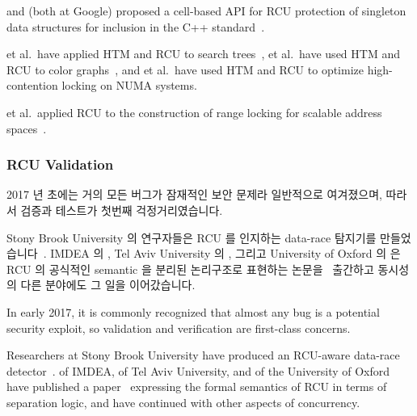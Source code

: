  and  (both at Google) proposed
a cell-based API for RCU
protection of singleton data structures for inclusion in the
C++ standard~\cite{GeoffRomer2018C++DeferredReclamationP0561R4}.

 et al.~have applied
HTM and RCU to search trees~\cite{Siakavaras2017CombiningHA,DimitriosSiakavaras2020RCU-HTM-B+Trees},
 et al.~have used HTM and RCU to color
graphs~\cite{ChristinaGiannoula2018HTM-RCU-graphcoloring},
and
 et al.~have used HTM and RCU to optimize high-contention
locking on NUMA systems.

 et al.~applied RCU to the construction of range locking
for scalable address spaces~\cite{AlexKogan2020RCUrangelocks}.

\fi

\subsubsection{RCU Validation}
\label{sec:defer:RCU Validation}

2017 년 초에는 거의 모든 버그가 잠재적인 보안 문제라 일반적으로 여겨졌으며,
따라서 검증과 테스트가 첫번째 걱정거리였습니다.

Stony Brook University 의 연구자들은 RCU 를 인지하는 data-race 탐지기를
만들었습니다~\cite{AbhinavDuggal2010Masters,JustinSeyster2012PhD,Seyster:2011:RFA:2075416.2075425}.
IMDEA 의 , Tel Aviv University 의 ,
그리고 University of Oxford 의  은 RCU 의 공식적인 semantic
을 분리된 논리구조로 표현하는
논문을~\cite{AlexeyGotsman2012VerifyGraceExtended} 출간하고 동시성의 다른
분야에도 그 일을 이어갔습니다.

\iffalse

In early 2017, it is commonly recognized that almost any bug is a potential
security exploit, so validation and verification are first-class concerns.

Researchers at Stony Brook University have produced an RCU-aware data-race
detector~\cite{AbhinavDuggal2010Masters,JustinSeyster2012PhD,Seyster:2011:RFA:2075416.2075425}.
 of IMDEA,  of Tel Aviv University,
and  of the University of Oxford have published a
paper~\cite{AlexeyGotsman2012VerifyGraceExtended} expressing the formal
semantics of RCU in terms of separation logic, and have continued with
other aspects of concurrency.

